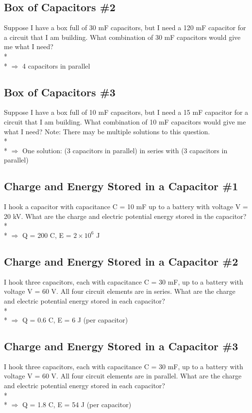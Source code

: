 \documentclass[11pt]{article}
\begin{document}
\subsection{Box of Capacitors \#2}
Suppose I have a box full of 30 mF capacitors, but I need a 120 mF capacitor for a circuit that I am building.  What combination of 30 mF capacitors would give me what I need?\\* \\*
$\Rightarrow$ 4 capacitors in parallel

\subsection{Box of Capacitors \#3}
Suppose I have a box full of 10 mF capacitors, but I need a 15 mF capacitor for a circuit that I am building.  What combination of 10 mF capacitors would give me what I need?  Note: There may be multiple solutions to this question.\\* \\*
$\Rightarrow$ One solution: (3 capacitors in parallel) in series with (3 capacitors in parallel)

\subsection{Charge and Energy Stored in a Capacitor \#1}
I hook a capacitor with capacitance C = 10 mF up to a battery with voltage V = 20 kV.  What are the charge and electric potential energy stored in the capacitor?\\* \\*
$\Rightarrow$ Q = 200 C, E = $2 \times 10^6$ J

\subsection{Charge and Energy Stored in a Capacitor \#2}
I hook three capacitors, each with capacitance C = 30 mF, up to a battery with voltage V = 60 V.  All four circuit elements are in series.  What are the charge and electric potential energy stored in each capacitor?\\* \\*
$\Rightarrow$ Q = 0.6 C, E = 6 J (per capacitor)

\subsection{Charge and Energy Stored in a Capacitor \#3}
I hook three capacitors, each with capacitance C = 30 mF, up to a battery with voltage V = 60 V.  All four circuit elements are in parallel.  What are the charge and electric potential energy stored in each capacitor?\\* \\*
$\Rightarrow$ Q = 1.8 C, E = 54 J (per capacitor)
\end{document}

